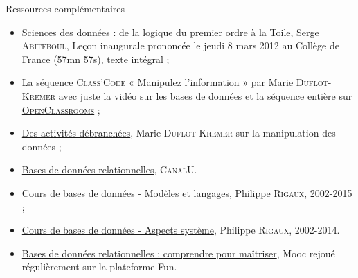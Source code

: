 \begin{gofurther}{Ressources complémentaires}
\begin{itemize}\jazzitem
	\item \href{https://www.college-de-france.fr/site/serge-abiteboul/inaugural-lecture-2012-03-08-18h00.htm}{Sciences des données : de la logique du premier ordre à la Toile}, Serge \textsc{Abiteboul}, Leçon inaugurale prononcée le jeudi 8 mars 2012 au Collège de France (57mn 57s), \href{https://books.openedition.org/cdf/529}{texte intégral} ;
	\item La séquence \textsc{Class'Code}  « Manipulez l'information » par Marie \textsc{Duflot-Kremer} avec juste la \href{https://vimeo.com/showcase/4032577/video/173747526}{vidéo sur les bases de données} et la \href{https://openclassrooms.com/fr/courses/3930076-manipuler-linformation/3930695-donnez-moi-des-donnees-ordonnees}{séquence entière sur \textsc{OpenClassrooms}} ;
	\item \href{https://pixees.fr/dans-la-famille-activites-debranchees-je-demande-les-tutos-videos-de-marie-duflot/}{Des activités débranchées}, Marie \textsc{Duflot-Kremer} sur la manipulation des données ;
	\item \href{https://www.canal-u.tv/producteurs/inria/cours_en_ligne/bases_de_donnees_relationnelles}{Bases de données relationnelles}, \textsc{CanalU}.
\end{itemize}

\begin{itemize}\jazzitem
	\item \href{http://sql.bdpedia.fr/}{Cours de bases de données - Modèles et langages}, Philippe \textsc{Rigaux}, 2002-2015 ;
	\item \href{http://sys.bdpedia.fr/}{Cours de bases de données - Aspects système}, Philippe \textsc{Rigaux}, 2002-2014.
\end{itemize}

\begin{itemize}\jazzitem
	\item \href{https://www.fun-mooc.fr/courses/inria/41008/session01/about}{Bases de données relationnelles : comprendre pour maîtriser}, Mooc rejoué régulièrement sur la plateforme Fun. 
\end{itemize}
\end{gofurther}



